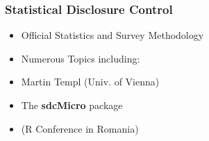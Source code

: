 \documentclass{beamer}
\begin{document}
%
\begin{frame}
	\frametitle{Statistical Disclosure Control}
	\begin{itemize}
		\item Official Statistics and Survey Methodology
		\item Numerous Topics including:
		\item Martin Templ (Univ. of Vienna)
		\item The \textbf{sdcMicro} package
		\item (R Conference in Romania)
	\end{itemize}
\end{frame}
\end{document}
